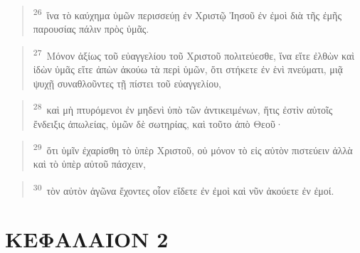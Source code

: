 \documentclass{article}
\newcommand{\currentverse}{1} %
\newcommand{\setcurrentverse}[1]{\renewcommand{\currentverse}{#1}}
\begin{document}
\begin{verse}

\setcurrentverse{26}

\setcounter{footnote}{0}

\textsuperscript{26}~ἵνα τὸ καύχημα ὑμῶν περισσεύῃ ἐν Χριστῷ Ἰησοῦ ἐν ἐμοὶ διὰ τῆς ἐμῆς παρουσίας πάλιν πρὸς ὑμᾶς.

\end{verse}

\begin{verse}

\setcurrentverse{27}

\setcounter{footnote}{0}

\textsuperscript{27}~Μόνον ἀξίως τοῦ εὐαγγελίου τοῦ Χριστοῦ πολιτεύεσθε, ἵνα εἴτε ἐλθὼν καὶ ἰδὼν ὑμᾶς εἴτε ἀπὼν ἀκούω τὰ περὶ ὑμῶν, ὅτι στήκετε ἐν ἑνὶ πνεύματι, μιᾷ ψυχῇ συναθλοῦντες τῇ πίστει τοῦ εὐαγγελίου,

\end{verse}

\begin{verse}

\setcurrentverse{28}

\setcounter{footnote}{0}

\textsuperscript{28}~καὶ μὴ πτυρόμενοι ἐν μηδενὶ ὑπὸ τῶν ἀντικειμένων, ἥτις ἐστὶν αὐτοῖς ἔνδειξις ἀπωλείας, ὑμῶν δὲ σωτηρίας, καὶ τοῦτο ἀπὸ Θεοῦ·

\end{verse}

\begin{verse}

\setcurrentverse{29}

\setcounter{footnote}{0}

\textsuperscript{29}~ὅτι ὑμῖν ἐχαρίσθη τὸ ὑπὲρ Χριστοῦ, οὐ μόνον τὸ εἰς αὐτὸν πιστεύειν ἀλλὰ καὶ τὸ ὑπὲρ αὐτοῦ πάσχειν,

\end{verse}

\begin{verse}

\setcurrentverse{30}

\setcounter{footnote}{0}

\textsuperscript{30}~τὸν αὐτὸν ἀγῶνα ἔχοντες οἷον εἴδετε ἐν ἐμοὶ καὶ νῦν ἀκούετε ἐν ἐμοί.

\end{verse}

\section*{ΚΕΦΑΛΑΙΟΝ 2}
\end{document}
